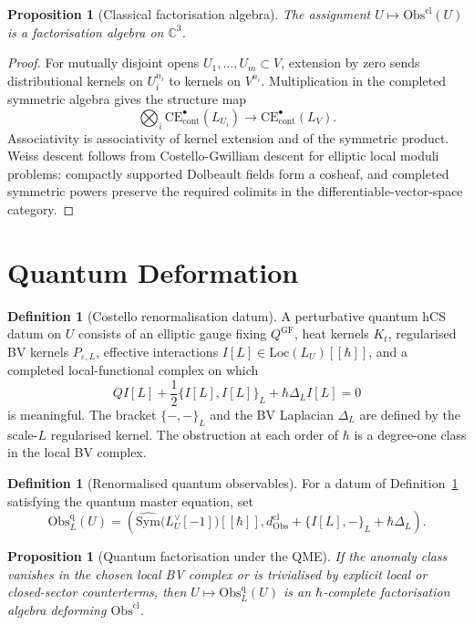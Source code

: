 \documentclass[11pt]{amsart}
\providecommand{\C}{\mathbb{C}}
\providecommand{\hb}{\hbar}
\providecommand{\Obs}{\mathrm{Obs}}
\providecommand{\Sym}{\mathrm{Sym}}
\providecommand{\CE}{\mathrm{CE}}
\providecommand{\Loc}{\mathrm{Loc}}
\theoremstyle{plain}
\newtheorem{proposition}[theorem]{Proposition}
\theoremstyle{definition}
\newtheorem{definition}[theorem]{Definition}
\theoremstyle{remark}
\begin{document}
\begin{proposition}[Classical factorisation algebra]\label{prop:e2-classical-factorisation}
The assignment $U\mapsto\Obs^{\mathrm{cl}}(U)$ is a factorisation algebra
on $\C^3$.
\end{proposition}

\begin{proof}
For mutually disjoint opens $U_1,\ldots,U_m\subset V$, extension by zero
sends distributional kernels on $U_i^{n_i}$ to kernels on $V^{n_i}$.
Multiplication in the completed symmetric algebra gives the structure
map
\[
 \bigotimes_i \CE^\bullet_{\mathrm{cont}}(L_{U_i})
 \longrightarrow
 \CE^\bullet_{\mathrm{cont}}(L_V).
\]
Associativity is associativity of kernel extension and of the symmetric
product. Weiss descent follows from Costello-Gwilliam descent for
elliptic local moduli problems: compactly supported Dolbeault fields
form a cosheaf, and completed symmetric powers preserve the required
colimits in the differentiable-vector-space category.
\end{proof}

\section{Quantum Deformation}

\begin{definition}[Costello renormalisation datum]\label{def:e2-renormalisation-datum}
A perturbative quantum hCS datum on $U$ consists of an elliptic gauge
fixing $Q^{\mathrm{GF}}$, heat kernels $K_t$, regularised BV kernels
$P_{\varepsilon,L}$, effective interactions
$I[L]\in\Loc(L_U)[[\hb]]$, and a completed local-functional complex on
which
\[
 QI[L]+\frac12\{I[L],I[L]\}_L+\hb\Delta_L I[L]=0
\]
is meaningful. The bracket $\{-,-\}_L$ and the BV Laplacian $\Delta_L$
are defined by the scale-$L$ regularised kernel. The obstruction at
each order of $\hb$ is a degree-one class in the local BV complex.
\end{definition}

\begin{definition}[Renormalised quantum observables]\label{def:e2-renormalised-bv}
For a datum of Definition~\ref{def:e2-renormalisation-datum} satisfying
the quantum master equation, set
\[
 \Obs^{\mathrm{q}}_L(U)
 =
 \left(
  \widehat{\Sym}\bigl(L_U^\vee[-1]\bigr)[[\hb]],
  d_{\Obs}^{\mathrm{cl}}+\{I[L],-\}_L+\hb\Delta_L
 \right).
\]
\end{definition}

\begin{proposition}[Quantum factorisation under the QME]\label{prop:e2-quantum-factorisation}
If the anomaly class vanishes in the chosen local BV complex or is
trivialised by explicit local or closed-sector counterterms, then
$U\mapsto\Obs^{\mathrm{q}}_L(U)$ is an $\hb$-complete factorisation
algebra deforming
$\Obs^{\mathrm{cl}}$.
\end{proposition}
\end{document}

